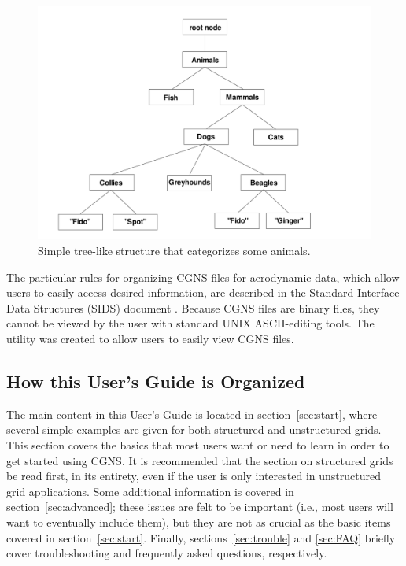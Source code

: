 \documentclass[12pt]{article}
\begin{document}
\begin{figure}[hpbt]
\centerline{{\includegraphics[width=150mm]{figures/intro_2}}}
\caption{Simple tree-like structure that categorizes some animals.}
\label{FIGintro_2}
\end{figure}
%

The particular rules for organizing CGNS files for aerodynamic
data, which allow users to easily access desired information, are described
in the Standard Interface Data Structures (SIDS) 
document \cite{ALLMARAS}.
Because CGNS files are binary files, they cannot be viewed by
the user with standard UNIX ASCII-editing tools.
The utility  was created to allow users to easily view
CGNS files.

\subsection{How this User's Guide is Organized}

The main content in this User's Guide is located in 
section~\ref{sec:start}, where several simple examples are
given for both structured and unstructured grids.  This section
covers the basics that most users want or need to learn in order
to get started using CGNS.  It is recommended that
the section on structured grids be read first, in its entirety,
even if the user is only interested in unstructured grid
applications.
Some additional information is covered
in section~\ref{sec:advanced}; these issues are felt to be important
(i.e., most users will want to eventually include them), but
they are not as crucial as the basic items covered in 
section~\ref{sec:start}.  Finally, sections~\ref{sec:trouble} and
\ref{sec:FAQ} briefly cover troubleshooting and frequently asked
questions, respectively.  
\end{document}
